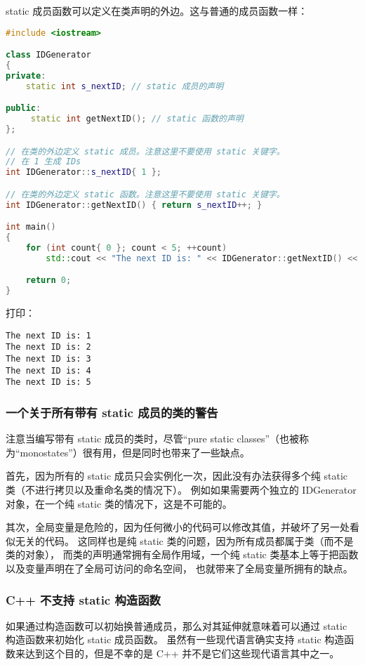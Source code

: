 \documentclass[../../LearnCpp.tex]{subfiles}
\begin{document}
static 成员函数可以定义在类声明的外边。这与普通的成员函数一样：

\begin{lstlisting}[language=C++]
#include <iostream>

class IDGenerator
{
private:
    static int s_nextID; // static 成员的声明

public:
     static int getNextID(); // static 函数的声明
};

// 在类的外边定义 static 成员。注意这里不要使用 static 关键字。
// 在 1 生成 IDs
int IDGenerator::s_nextID{ 1 };

// 在类的外边定义 static 函数。注意这里不要使用 static 关键字。
int IDGenerator::getNextID() { return s_nextID++; }

int main()
{
    for (int count{ 0 }; count < 5; ++count)
        std::cout << "The next ID is: " << IDGenerator::getNextID() << '\n';

    return 0;
}
\end{lstlisting}

打印：

\begin{lstlisting}
The next ID is: 1
The next ID is: 2
The next ID is: 3
The next ID is: 4
The next ID is: 5
\end{lstlisting}

\subsubsection*{一个关于所有带有 static 成员的类的警告}

注意当编写带有 static 成员的类时，尽管“pure static classes”（也被称为“monostates”）很有用，但是同时也带来了一些缺点。

首先，因为所有的 static 成员只会实例化一次，因此没有办法获得多个纯 static 类（不进行拷贝以及重命名类的情况下）。
例如如果需要两个独立的 IDGenerator 对象，在一个纯 static 类的情况下，这是不可能的。

其次，全局变量是危险的，因为任何微小的代码可以修改其值，并破坏了另一处看似无关的代码。
这同样也是纯 static 类的问题，因为所有成员都属于类（而不是类的对象），
而类的声明通常拥有全局作用域，一个纯 static 类基本上等于把函数以及变量声明在了全局可访问的命名空间，
也就带来了全局变量所拥有的缺点。

\subsubsection*{C++ 不支持 static 构造函数}

如果通过构造函数可以初始换普通成员，那么对其延伸就意味着可以通过 static 构造函数来初始化 static 成员函数。
虽然有一些现代语言确实支持 static 构造函数来达到这个目的，但是不幸的是 C++ 并不是它们这些现代语言其中之一。
\end{document}
